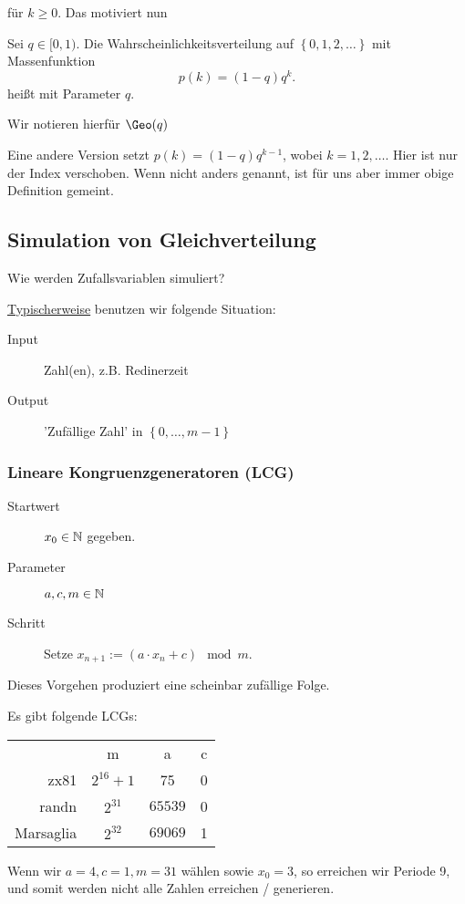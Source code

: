     für $k\geq 0$. Das motiviert nun
    \begin{definition}\label{def:geometrische-verteilung}
        Sei  $q\in [0,1)$. Die Wahrscheinlichkeitsverteilung auf $\left \{0,1,2,\ldots\right\} $ mit Massenfunktion
        \[
            p(k) = (1-q)q^k
        .\] 
        heißt  mit Parameter $q$.
    \end{definition}
    \begin{notation}
        Wir notieren hierfür $\Geo(q)$
    \end{notation}
    \begin{warning}
        Eine andere Version setzt $p(k) = (1-q)q^{k-1}$, wobei $k=1,2,\ldots$. Hier ist nur der Index verschoben. Wenn nicht anders genannt, ist für uns aber immer obige Definition gemeint.
    \end{warning}
\subsection{Simulation von Gleichverteilung}
\label{sec:simulation-von-gleichverteilung}
\begin{question}
    Wie werden Zufallsvariablen simuliert?
\end{question}
\underline{Typischerweise} benutzen wir folgende Situation:
\begin{description}
    \item[Input] Zahl(en), z.B. Redinerzeit
    \item[Output] 'Zufällige Zahl' in $\left \{0,\ldots,m-1\right\} $
\end{description}

\subsubsection{Lineare Kongruenzgeneratoren (LCG)}
\begin{description}
    \item[Startwert] $x_0\in \mathbb{N}$ gegeben.
    \item[Parameter] $a,c,m\in \mathbb{N}$
    \item[Schritt] Setze $x_{n+1} := (a\cdot x_n + c) \mod m$.
\end{description}
Dieses Vorgehen produziert eine scheinbar zufällige Folge.
\begin{example}
    Es gibt folgende LCGs: \\
        \begin{tabular}{r|c|c|c}
            & m & a & c \\
            {\sc zx81} & $2^{16}+1$ & 75 & 0 \\
            {\sc randn} &  $2^{31}$&$65539$  & 0\\
            Marsaglia & $2^{32}$ & $69069$ & 1
        \end{tabular}
\end{example}
\begin{example}
    Wenn wir $a=4, c=1, m=31$ wählen sowie  $x_0 = 3$,  so erreichen wir Periode 9, und somit werden nicht alle Zahlen erreichen / generieren. 
\end{example}

